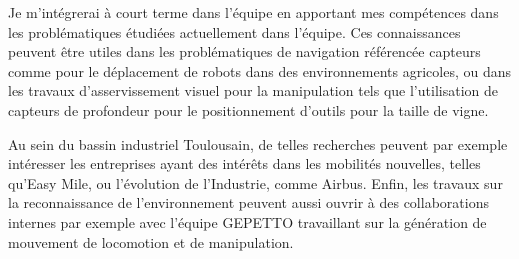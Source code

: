 Je m'intégrerai à court terme dans l'équipe en apportant mes compétences dans les problématiques étudiées actuellement dans l'équipe. Ces connaissances peuvent être utiles dans les problématiques de navigation référencée capteurs comme pour le déplacement de robots dans des environnements agricoles, ou dans les travaux d'asservissement visuel pour la manipulation tels que l'utilisation de capteurs de profondeur pour le positionnement d'outils pour la taille de vigne.

Au sein du bassin industriel Toulousain, de telles recherches peuvent par exemple intéresser les entreprises ayant des intérêts dans les mobilités nouvelles, telles qu'Easy Mile, ou l'évolution de l'Industrie, comme Airbus. Enfin, les travaux sur la reconnaissance de l'environnement peuvent aussi ouvrir à des collaborations internes par exemple avec l'équipe GEPETTO travaillant sur la génération de mouvement de locomotion et de manipulation.
